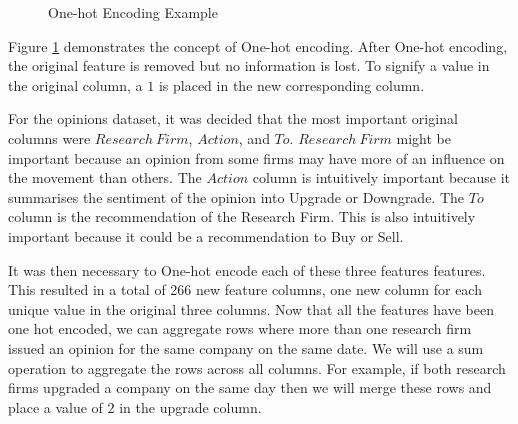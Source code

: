 \documentclass{report}
\begin{document}
\begin{figure}[H]
\caption{One-hot Encoding Example}
\vspace{8pt}
\centerline{
\hspace{20pt}
}
\label{fig:one-hot}
\end{figure}

Figure \ref{fig:one-hot} demonstrates the concept of One-hot encoding. After One-hot encoding, the original feature is removed but no information is lost. To signify a value in the original column, a $1$ is placed in the new corresponding column.

For the opinions dataset, it was decided that the most important original columns were $Research\ Firm$, $Action$, and $To$. $Research\ Firm$ might be important because an opinion from some firms may have more of an influence on the movement than others. The $Action$ column is intuitively important because it summarises the sentiment of the opinion into Upgrade or Downgrade. The $To$ column is the recommendation of the Research Firm. This is also intuitively important because it could be a recommendation to Buy or Sell.

It was then necessary to One-hot encode each of these three features features. This resulted in a total of 266 new feature columns, one new column for each unique value in the original three columns. Now that all the features have been one hot encoded, we can aggregate rows where more than one research firm issued an opinion for the same company on the same date. We will use a sum operation to aggregate the rows across all columns. For example, if both research firms upgraded a company on the same day then we will merge these rows and place a value of $2$ in the upgrade column.
\end{document}
